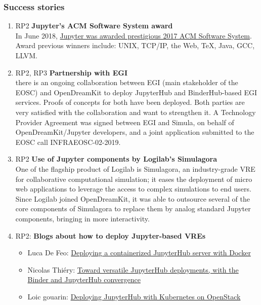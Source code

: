 \subsubsection{Success stories}
\begin{enumerate}
\item RP2 \textbf{Jupyter's ACM Software System award}\\
  In June 2018,
  \href{https://blog.jupyter.org/jupyter-receives-the-acm-software-system-award-d433b0dfe3a2}{Jupyter
    was awarded prestigious 2017 ACM Software System}. Award previous
  winners include: UNIX, TCP/IP, the Web, TeX, Java, GCC, LLVM.

\item RP2, RP3 \textbf{Partnership with EGI}\\
  there is an ongoing collaboration between EGI (main stakeholder of
  the EOSC) and OpenDreamKit to deploy JupyterHub and BinderHub-based
  EGI services. Proofs of concepts for both have been
  deployed.%
  Both parties are very satisfied with the collaboration and want to
  strengthen it. A Technology Provider Agreement was signed between
  EGI and Simula, on behalf of OpenDreamKit/Jupyter developers, and a
  joint application submitted to the EOSC call INFRAEOSC-02-2019.

\item RP2 \textbf{Use of Jupyter components by Logilab's Simulagora}\\
  One of the flagship product of Logilab is Simulagora, an
  industry-grade VRE for collaborative computational simulation; it
  eases the deployment of micro web applications to leverage the
  access to complex simulations to end users. Since Logilab joined
  OpenDreamKit, it was able to outsource several of the core
  components of Simulagora to replace them by analog standard Jupyter
  components, bringing in more interactivity.

\item RP2: \textbf{Blogs about how to deploy Jupyter-based VREs}
  \begin{itemize}
  \item Luca De Feo: \href{https://opendreamkit.org/2018/10/17/jupyterhub-docker/}{Deploying a containerized JupyterHub server with Docker}
  \item Nicolas Thiéry: \href{https://opendreamkit.org/2018/03/15/jupyterhub-binder-convergence/}{Toward versatile JupyterHub deployments, with the Binder and JupyterHub convergence}
  \item Loic gouarin: \href{https://blog.jupyter.org/how-to-deploy-jupyterhub-with-kubernetes-on-openstack-f8f6120d4b1}{Deploying JupyterHub with Kubernetes on OpenStack}
  \end{itemize}


\end{enumerate}

